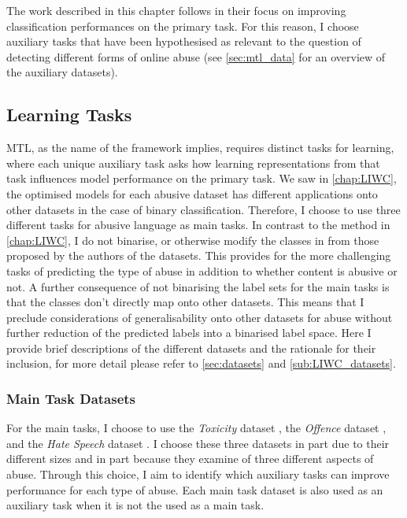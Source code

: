 The work described in this chapter follows \citet{Rajamanickam:2020} in their focus on improving classification performances on the primary task.
For this reason, I choose auxiliary tasks that have been hypothesised as relevant to the question of detecting different forms of online abuse (see \cref{sec:mtl_data} for an overview of the auxiliary datasets).

\subsection{Learning Tasks}\label{sec:mtl_tasks}
MTL, as the name of the framework implies, requires distinct tasks for learning, where each unique auxiliary task asks how learning representations from that task influences model performance on the primary task.
We saw in \cref{chap:LIWC}, the optimised models for each abusive dataset has different applications onto other datasets in the case of binary classification. Therefore, I choose to use three different tasks for abusive language as main tasks.
In contrast to the method in \cref{chap:LIWC}, I do not binarise, or otherwise modify the classes in from those proposed by the authors of the datasets.
This provides for the more challenging tasks of predicting the type of abuse in addition to whether content is abusive or not.
A further consequence of not binarising the label sets for the main tasks is that the classes don't directly map onto other datasets.
This means that I preclude considerations of generalisability onto other datasets for abuse without further reduction of the predicted labels into a binarised label space.
Here I provide brief descriptions of the different datasets and the rationale for their inclusion, for more detail please refer to \cref{sec:datasets} and \cref{sub:LIWC_datasets}.

\subsubsection{Main Task Datasets}
For the main tasks, I choose to use the \textit{Toxicity} dataset \citep{Wulczyn:2017}, the \textit{Offence} dataset \citep{Davidson:2017}, and the \textit{Hate Speech} dataset \citep{Waseem-Hovy:2016}. I choose these three datasets in part due to their different sizes and in part because they examine of three different aspects of abuse.
Through this choice, I aim to identify which auxiliary tasks can improve performance for each type of abuse.
Each main task dataset is also used as an auxiliary task when it is not the used as a main task.

